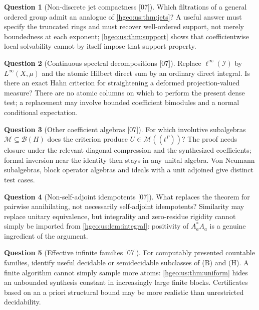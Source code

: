 \documentclass[11pt,letterpaper]{article}
\numberwithin{equation}{section}
\theoremstyle{definition}
\newtheorem{question}[question]{Question}
\theoremstyle{remark}
\newcommand{\src}[1]{\textup{\textsf{\small[#1]}}}
\begin{document}
\begin{question}[Non-discrete jet compactness \src{07}]\label{hgeo:us:q:jets}
Which filtrations of a general ordered group admit an analogue of
\cref{hgeo:us:thm:jets}? A useful answer must specify the truncated rings and
must recover well-ordered support, not merely boundedness at each exponent;
\cref{hgeo:us:thm:support} shows that coefficientwise local solvability cannot
by itself impose that support property.
\end{question}

\begin{question}[Continuous spectral decompositions \src{07}]
\label{hgeo:us:q:continuous}
Replace $\ell^\infty(\mathcal I)$ by $L^\infty(X,\mu)$ and the atomic Hilbert
direct sum by an ordinary direct integral. Is there an exact Hahn criterion
for straightening a deformed projection-valued measure? There are no atomic
columns on which to perform the present dense test; a replacement may involve
bounded coefficient bimodules and a normal conditional expectation.
\end{question}

\begin{question}[Other coefficient algebras \src{07}]\label{hgeo:us:q:algebras}
For which involutive subalgebras $\mathcal M\subseteq\mathcal B(H)$ does the
criterion produce $U\in\mathcal M((t^\Gamma))$? The proof needs closure under
the relevant diagonal compression and the synthesized coefficients; formal
inversion near the identity then stays in any unital algebra. Von Neumann
subalgebras, block operator algebras and ideals with a unit adjoined give
distinct test cases.
\end{question}

\begin{question}[Non-self-adjoint idempotents \src{07}]
\label{hgeo:us:q:idempotents}
What replaces the theorem for pairwise annihilating, not necessarily
self-adjoint idempotents? Similarity may replace unitary equivalence, but
integrality and zero-residue rigidity cannot simply be imported from
\cref{hgeo:us:lem:integral}: positivity of $A_a^*A_a$ is a genuine ingredient
of the argument.
\end{question}

\begin{question}[Effective infinite families \src{07}]\label{hgeo:us:q:effective}
For computably presented countable families, identify useful decidable or
semidecidable subclasses of (B) and (H). A finite algorithm cannot simply
sample more atoms: \cref{hgeo:us:thm:uniform} hides an unbounded synthesis
constant in increasingly large finite blocks. Certificates based on an a
priori structural bound may be more realistic than unrestricted decidability.
\end{question}
\end{document}
